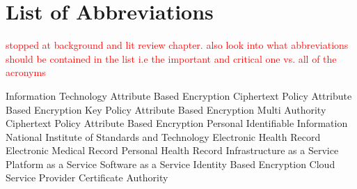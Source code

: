 \chapter*{List of Abbreviations}

\textcolor{red}{stopped at background and lit review chapter. also look into what abbreviations should be contained in the list i.e the important and critical one vs. all of the acronyms}

\begin{acronym}[XXXXXXXX]
		{Information Technology}
		{Attribute Based Encryption}
	{Ciphertext Policy Attribute Based Encryption}
	{Key Policy Attribute Based Encryption}
	{Multi Authority Ciphertext Policy Attribute Based Encryption}
		{Personal Identifiable Information}
		{National Institute of Standards and Technology}
		{Electronic Health Record}
		{Electronic Medical Record}
		{Personal Health Record}
		{Infrastructure as a Service}
		{Platform as a Service}
		{Software as a Service}
		{Identity Based Encryption}
		{Cloud Service Provider}
 		{Certificate Authority}
\end{acronym}